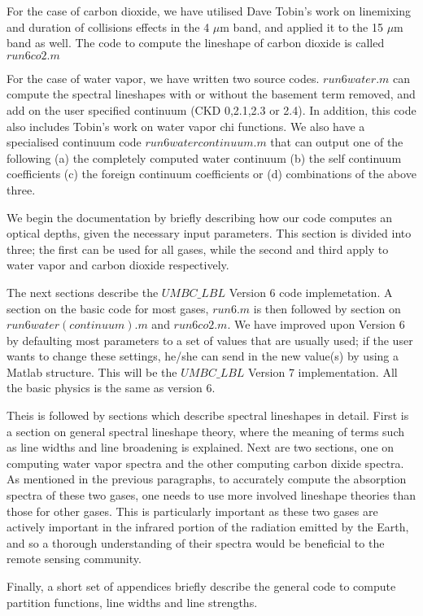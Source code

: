 \documentclass[11pt]{article}
\begin{document}
For the case of carbon dioxide, we have utilised Dave Tobin's work on 
linemixing and duration of collisions effects in the 4 $\mu$m band, and
applied it to the 15 $\mu$m band as well. The code to compute the lineshape 
of carbon dioxide is called $run6co2.m$

For the case of water vapor, we have written two source codes. $run6water.m$
can compute the spectral lineshapes with or without the basement term removed,
and add on the user specified continuum (CKD 0,2.1,2.3 or 2.4). In addition,
this code also includes Tobin's work on water vapor chi functions. We also
have a specialised continuum code  $run6watercontinuum.m$ that can output one 
of the following (a) the completely computed water continuum (b) the self
continuum coefficients (c) the foreign continuum coefficients or (d) 
combinations of the above three.

We begin the documentation by briefly describing how our code computes an 
optical depths, given the necessary input parameters. This section is 
divided into three; the first can be used for all gases, while the second 
and third apply to water vapor and carbon dioxide respectively.

The next sections describe the $UMBC\_LBL$ Version 6 code implemetation. 
A section on the basic code for most gases, $run6.m$ is then followed by 
section on $run6water(continuum).m$ and $run6co2.m$. We have improved upon 
Version 6 by defaulting most parameters to a set of values that are usually 
used; if the user wants to change these settings, he/she can send in the new 
value(s) by using a Matlab structure. This will be the $UMBC\_LBL$ Version 7 
implementation. All the basic physics is the same as version 6.

Theis is followed by sections which describe spectral 
lineshapes in detail. First is a section  on general spectral lineshape 
theory, where the meaning of terms such as line widths and line broadening 
is explained. Next are two sections, one on 
computing water vapor spectra and the other computing carbon dixide 
spectra. As mentioned in the previous paragraphs, to accurately compute 
the absorption spectra of these two gases, one needs to use more involved 
lineshape theories than those for other gases. This is particularly 
important as these two gases are actively important in the infrared 
portion of the radiation emitted by the Earth, and so a thorough 
understanding of their spectra would be beneficial to the remote sensing 
community. 
 
Finally, a short set of appendices briefly describe the general code to 
compute partition functions, line widths and line strengths. 
\end{document}
